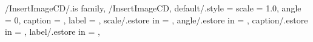 \pgfkeys
{
  /InsertImageCD/.is family, /InsertImageCD,
  default/.style = 
  {
    scale = 1.0,
    angle = 0,
    caption = \empty,
    label = \empty
  },
  scale/.estore in = \InsertImageCDScale,
  angle/.estore in = \InsertImageCDAngle,
  caption/.estore in = \InsertImageCDCaption,
  label/.estore in = \InsertImageCDLabel,
} %

\newcommand\InsertImageB[2][\empty]
{
  \pgfkeys{/InsertImageB, default, #1}%
  Scale: \InsertImageBScale\\
  Angle: \InsertImageBAngle\\
  caption: \InsertImageBCaption\\
  label: \InsertImageBLabel\\
  Path: #2\\
}

\newcommand\InsertImageCD[2][\empty]
{
  \pgfkeys{/InsertImageCD, default, #1}%
  Scale: \InsertImageCDScale\\
  Angle: \InsertImageCDAngle\\
  caption: \InsertImageCDCaption\\
  label: \InsertImageCDLabel\\
  Path: #2\\
}
